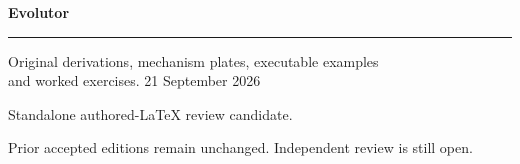 \documentclass[11pt,oneside,openany]{book}
\begin{document}
\frontmatter
\begin{titlepage}
\color{Blue}\sffamily\vspace*{20mm}
{\Huge\bfseries Evolutor\par}
\vspace{10mm}{\LARGE Chapter 10\par}
\vspace{8mm}{\Large Conditional computation and routing\par}
\vspace{12mm}\rule{\linewidth}{.8pt}
\vspace{6mm}\par Original derivations, mechanism plates, executable examples\\and worked exercises.
\vfill 21 September 2026\par
Standalone authored-LaTeX review candidate.\par
Prior accepted editions remain unchanged. Independent review is still open.
\end{titlepage}
\tableofcontents
\mainmatter
\setcounter{chapter}{9}

\backmatter

\clearpage{}
\printindex
\end{document}
